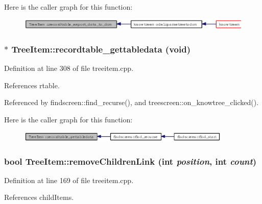 Here is the caller graph for this function:\begin{figure}[H]
\begin{center}
\leavevmode
\includegraphics[width=394pt]{classTreeItem_0881f776f987c732545d57a4553ed405_icgraph}
\end{center}
\end{figure}
\subsubsection{ $\ast$ Tree\-Item::recordtable\_\-gettabledata (void)}\label{classTreeItem_8f23227037841048efa95d2e22d0c2d7}




Definition at line 308 of file treeitem.cpp.

References rtable.

Referenced by findscreen::find\_\-recurse(), and treescreen::on\_\-knowtree\_\-clicked().

Here is the caller graph for this function:\begin{figure}[H]
\begin{center}
\leavevmode
\includegraphics[width=288pt]{classTreeItem_8f23227037841048efa95d2e22d0c2d7_icgraph}
\end{center}
\end{figure}
\subsubsection{\setlength{\rightskip}{0pt plus 5cm}bool Tree\-Item::remove\-Children\-Link (int {\em position}, int {\em count})\hspace{0.3cm}{\tt  [private]}}\label{classTreeItem_8f1bcb3b23412364f198e4782058a0e4}




Definition at line 169 of file treeitem.cpp.

References child\-Items.
